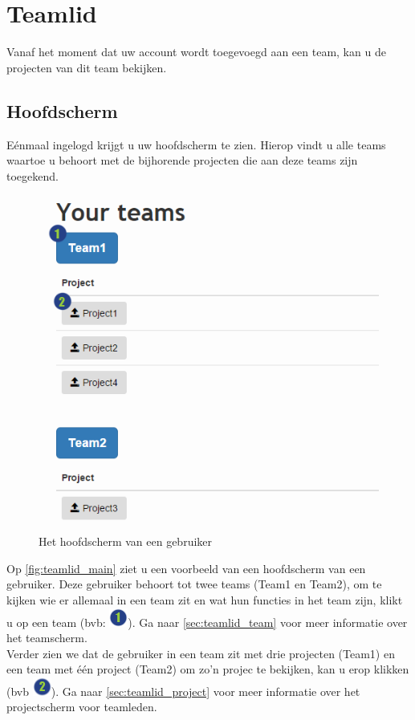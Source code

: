 \documentclass[a4paper,11pt]{article}
\newcommand{\one}{\includegraphics[scale=0.5]{Gebruikershandleiding_img/1.png}}
\newcommand{\two}{\includegraphics[scale=0.5]{Gebruikershandleiding_img/2.png}}
\begin{document}
\section{Teamlid}
\label{sec:teamlid}
Vanaf het moment dat uw account wordt toegevoegd aan een team, kan u de projecten van dit team bekijken.

\subsection{Hoofdscherm}
\label{sec:teamlid_main}
E\'enmaal ingelogd krijgt u uw hoofdscherm te zien. Hierop vindt u alle teams waartoe u behoort met de bijhorende projecten die aan deze teams zijn toegekend. %

\begin{figure}[H]
\centering
\includegraphics[scale=0.5]{Gebruikershandleiding_img/main.png}
\caption{Het hoofdscherm van een gebruiker}
\label{fig:teamlid_main}
\end{figure}

Op \autoref{fig:teamlid_main} ziet u een voorbeeld van een hoofdscherm van een gebruiker. Deze gebruiker behoort tot twee teams (Team1 en Team2), om te kijken wie er allemaal in een team zit en wat hun functies in het team zijn, klikt u op een team (bvb: \one). Ga naar \autoref{sec:teamlid_team} voor meer informatie over het teamscherm.\\
Verder zien we dat de gebruiker in een team zit met drie projecten (Team1) en een team met \'e\'en project (Team2) om zo'n projec te bekijken, kan u erop klikken (bvb \two). Ga naar \autoref{sec:teamlid_project} voor meer informatie over het projectscherm voor teamleden.
\end{document}
